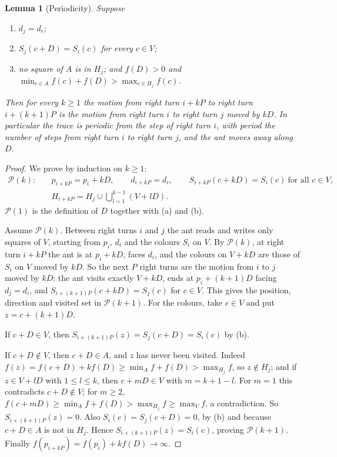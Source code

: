 \documentclass[11pt,a4paper]{article}
\newtheorem{lemma}[theorem]{Lemma}
\theoremstyle{definition}
\theoremstyle{remark}
\begin{document}
\begin{lemma}[Periodicity]\label{lem:period}
Suppose
\begin{enumerate}[nosep,label=(\alph*)]
\item $d_j = d_i$;
\item $S_j(c + D) = S_i(c)$ for every $c \in V$;
\item no square of $A$ is in $H_j$; and $f(D) > 0$ and $\min_{c \in A} f(c) + f(D) > \max_{c \in H_j} f(c)$.
\end{enumerate}
Then for every $k \ge 1$ the motion from right turn $i + kP$ to right turn $i + (k+1)P$ is the motion from right
turn $i$ to right turn $j$ moved by $kD$. In particular the trace is periodic from the step of right turn $i$,
with period the number of steps from right turn $i$ to right turn $j$, and the ant moves away along $D$.
\end{lemma}

\begin{proof}
We prove by induction on $k \ge 1$:
\begin{align*}
\mathcal{P}(k):\quad & p_{i+kP} = p_i + kD,\qquad d_{i+kP} = d_i,\qquad
S_{i+kP}(c + kD) = S_i(c)\ \text{for all } c \in V,\\
& H_{i+kP} = H_j \cup \textstyle\bigcup_{l=1}^{k-1}(V + lD).
\end{align*}
$\mathcal{P}(1)$ is the definition of $D$ together with (a) and (b).

Assume $\mathcal{P}(k)$. Between right turns $i$ and $j$ the ant reads and writes only squares of $V$, starting
from $p_i$, $d_i$ and the colours $S_i$ on $V$. By $\mathcal{P}(k)$, at right turn $i+kP$ the ant is at
$p_i + kD$, faces $d_i$, and the colours on $V + kD$ are those of $S_i$ on $V$ moved by $kD$. So the next $P$
right turns are the motion from $i$ to $j$ moved by $kD$: the ant visits exactly $V + kD$, ends at
$p_i + (k+1)D$ facing $d_j = d_i$, and $S_{i+(k+1)P}(c + kD) = S_j(c)$ for $c \in V$. This gives the position,
direction and visited set in $\mathcal{P}(k+1)$. For the colours, take $c \in V$ and put $z = c + (k+1)D$.

If $c + D \in V$, then $S_{i+(k+1)P}(z) = S_j(c + D) = S_i(c)$ by (b).

If $c + D \notin V$, then $c + D \in A$, and $z$ has never been visited. Indeed
$f(z) = f(c + D) + k f(D) \ge \min_A f + f(D) > \max_{H_j} f$, so $z \notin H_j$; and if $z \in V + lD$ with
$1 \le l \le k$, then $c + mD \in V$ with $m = k + 1 - l$. For $m = 1$ this contradicts $c + D \notin V$; for
$m \ge 2$, $f(c + mD) \ge \min_A f + f(D) > \max_{H_j} f \ge \max_V f$, a contradiction. So
$S_{i+(k+1)P}(z) = 0$. Also $S_i(c) = S_j(c + D) = 0$, by (b) and because $c + D \in A$ is not in $H_j$.
Hence $S_{i+(k+1)P}(z) = S_i(c)$, proving $\mathcal{P}(k+1)$. Finally $f(p_{i+kP}) = f(p_i) + kf(D) \to \infty$.
\end{proof}
\end{document}
